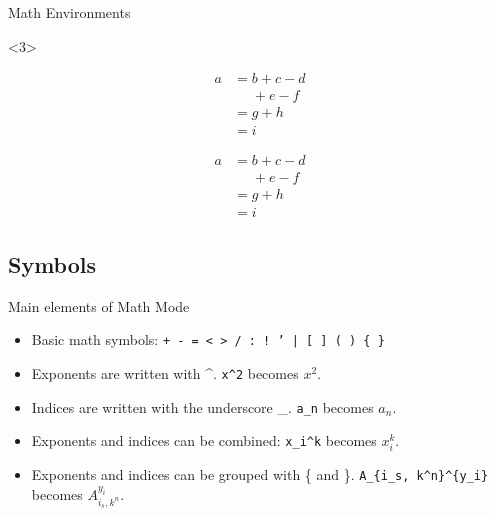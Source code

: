\begin{frame}[fragile]{Math Environments}
	\begin{onlyenv}
\begin{codesource}
	\begin{equation}
		\begin{split}
			a &= b + c - d \\
			&\phantom{=} + e - f \\
			&= g + h \\
			&= i
		\end{split}
	\end{equation}
\end{codesource}
		\begin{equation}
			\begin{split}
				a &= b + c - d \\
				&\phantom{=} + e - f \\
				&= g + h \\
				&= i
			\end{split}
		\end{equation}
	\end{onlyenv}
\end{frame}

\subsection{Symbols}

\begin{frame}[fragile,c]{Main elements of Math Mode}
	\begin{itemize}
		\item Basic math symbols:
		 	\texttt{+ - = < > / : ! ' | [ ] ( ) \{ \}}
		\item Exponents are written with \textasciicircum. \lstinline|x^2| becomes $x^2$.
		\item Indices are written with the underscore \_. \lstinline|a_n| becomes $a_n$.
		\item Exponents and indices can be combined: \lstinline|x_i^k| becomes $x_i^k$.
		\item Exponents and indices can be grouped with \{ and \}. \lstinline|A_{i_s, k^n}^{y_i}|
			becomes $A_{i_s, k^n}^{y_i}$.
	\end{itemize}
\end{frame}

